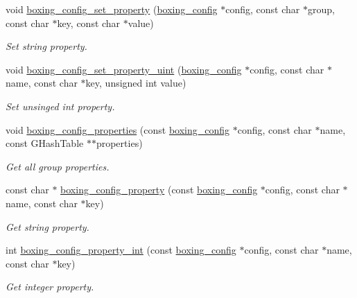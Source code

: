 \begin{DoxyCompactItemize}
void \hyperlink{group__config_gaba83318eb9eab4e010742c737b1f5782}{boxing\_\-config\_\-set\_\-property} (\hyperlink{structboxing__config__s}{boxing\_\-config} $\ast$config, const char $\ast$group, const char $\ast$key, const char $\ast$value)
\begin{DoxyCompactList}\small\item\em Set string property. \item\end{DoxyCompactList}\item 
void \hyperlink{group__config_gaae0ab5e0bb90813ced395324ca46f2b0}{boxing\_\-config\_\-set\_\-property\_\-uint} (\hyperlink{structboxing__config__s}{boxing\_\-config} $\ast$config, const char $\ast$name, const char $\ast$key, unsigned int value)
\begin{DoxyCompactList}\small\item\em Set unsinged int property. \item\end{DoxyCompactList}\item 
void \hyperlink{group__config_gac01d325efa09fedfeae80c786be002c9}{boxing\_\-config\_\-properties} (const \hyperlink{structboxing__config__s}{boxing\_\-config} $\ast$config, const char $\ast$name, const GHashTable $\ast$$\ast$properties)
\begin{DoxyCompactList}\small\item\em Get all group properties. \item\end{DoxyCompactList}\item 
const char $\ast$ \hyperlink{group__config_ga4065b7a4d735f8df7e12900d73b4fb7a}{boxing\_\-config\_\-property} (const \hyperlink{structboxing__config__s}{boxing\_\-config} $\ast$config, const char $\ast$name, const char $\ast$key)
\begin{DoxyCompactList}\small\item\em Get string property. \item\end{DoxyCompactList}\item 
int \hyperlink{group__config_ga7fa190ebd009d28afed48273930b1365}{boxing\_\-config\_\-property\_\-int} (const \hyperlink{structboxing__config__s}{boxing\_\-config} $\ast$config, const char $\ast$name, const char $\ast$key)
\begin{DoxyCompactList}\small\item\em Get integer property. \item\end{DoxyCompactList}\item 
$$
\end{DoxyCompactItemize}
